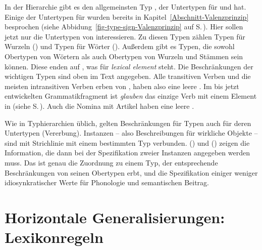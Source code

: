In der Hierarchie gibt es den allgemeinsten Typ , der Untertypen für  und
 hat. Einige der Untertypen für  wurden bereits in
Kapitel~\ref{Abschnitt-Valenzprinzip} besprochen (siehe Abbidung~\ref{fig-type-sign-Valenzprinzip}
auf S.\,\pageref{fig-type-sign-Valenzprinzip}). Hier sollen jetzt nur die Untertypen von
 interessieren. Zu diesen Typen zählen Typen für Wurzeln () und Typen
für Wörter (). Außerdem gibt es Typen, die sowohl Obertypen von Wörtern als auch
Obertypen von Wurzeln und Stämmen sein können. Diese enden auf , was für \emph{lexical element}
steht. Die Beschränkungen der wichtigen Typen sind oben im Text angegeben. Alle transitiven Verben
und die meisten intransitiven Verben erben von , haben also eine leere
\hconsl. Im bis jetzt entwickelten Grammatikfragment ist \emph{glauben} das einzige Verb mit einem
Element in \hcons (siehe S.\,\pageref{le-glauben}). Auch die Nomina mit Artikel haben eine leere
\hconsl. 

Wie in Typhierarchien üblich, gelten Beschränkungen für Typen auch für deren Untertypen (Vererbung).
Instanzen -- also Beschreibungen für wirkliche Objekte -- sind mit Strichlinie mit einem bestimmten Typ verbunden.
() und () zeigen die Information, die dann bei der Spezifikation zweier Instanzen angegeben
werden muss. Das ist genau die Zuordnung zu einem Typ, der entsprechende Beschränkungen von seinen
Obertypen erbt, und die Spezifikation einiger weniger idiosynkratischer Werte für Phonologie
und semantischen Beitrag.
\ea
{}
\z
\ea
{}
\z
{}



\section{Horizontale Generalisierungen: Lexikonregeln}
\label{sec-lr}\label{Abschnitt-Lexikonregeln}


